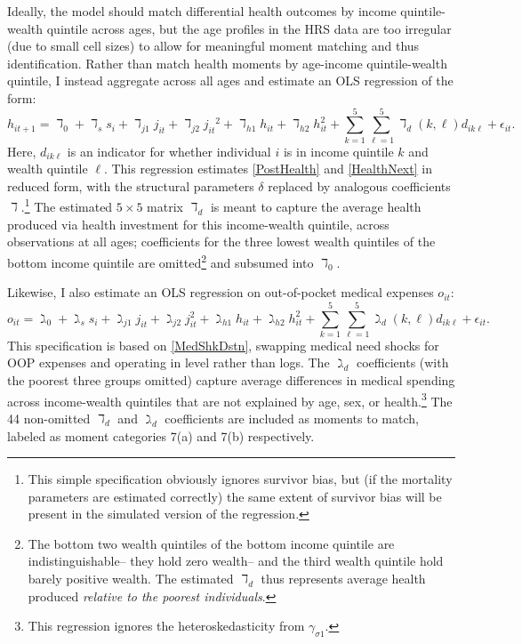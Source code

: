 \documentclass[12pt,pdftex,letterpaper]{article}
\newcommand{\Health}{h}
\newcommand{\MedShkParam}{\gamma}
\newcommand{\MedShkParamAlt}{\gimel}
\newcommand{\OOP}{o}
\newcommand{\HealthParam}{\delta}
\newcommand{\HealthParamAlt}{\daleth}
\newcommand{\Sex}{s}
\begin{document}
Ideally, the model should match differential health outcomes by income quintile-wealth quintile across ages, but the age profiles in the HRS data are too irregular (due to small cell sizes) to allow for meaningful moment matching and thus identification.  Rather than match health moments by age-income quintile-wealth quintile, I instead aggregate across all ages and estimate an OLS regression of the form:
\begin{equation}\label{HealthOLS}
\Health_{it+1} = \HealthParamAlt_0 + \HealthParamAlt_{\Sex} \Sex_i + \HealthParamAlt_{j1} j_{it} + \HealthParamAlt_{j2} {j_{it}}^2 + \HealthParamAlt_{\Health 1} \Health_{it} + \HealthParamAlt_{\Health 2} \Health_{it}^2 + \sum_{k=1}^{5} \sum_{\ell=1}^{5} \HealthParamAlt_{d}(k,\ell) d_{ik\ell} + \epsilon_{it}.
\end{equation}
Here, $d_{ik\ell}$ is an indicator for whether individual $i$ is in income quintile $k$ and wealth quintile $\ell$.  This regression estimates \eqref{PostHealth} and \eqref{HealthNext} in reduced form, with the structural parameters $\HealthParam$ replaced by analogous coefficients $\HealthParamAlt$.\footnote{This simple specification obviously ignores survivor bias, but (if the mortality parameters are estimated correctly) the same extent of survivor bias will be present in the simulated version of the regression.}  The estimated $5 \times 5$ matrix $\HealthParamAlt_d$ is meant to capture the average health produced via health investment for this income-wealth quintile, across observations at all ages; coefficients for the three lowest wealth quintiles of the bottom income quintile are omitted\footnote{The bottom two wealth quintiles of the bottom income quintile are indistinguishable-- they hold zero wealth-- and the third wealth quintile hold barely positive wealth.  The estimated $\HealthParamAlt_d$ thus represents average health produced \textit{relative to the poorest individuals}.} and subsumed into $\HealthParamAlt_0$.

Likewise, I also estimate an OLS regression on out-of-pocket medical expenses $\OOP_{it}$:
\begin{equation}\label{OOPOLS}
\OOP_{it} = \MedShkParamAlt_0 + \MedShkParamAlt_{\Sex} \Sex_i + \MedShkParamAlt_{j1} j_{it} + \MedShkParamAlt_{j2} j_{it}^2 + \MedShkParamAlt_{\Health 1} \Health_{it} + \MedShkParamAlt_{\Health 2} \Health_{it}^2 + \sum_{k=1}^{5} \sum_{\ell=1}^{5} \MedShkParamAlt_{d}(k,\ell) d_{ik\ell} + \epsilon_{it}.
\end{equation}
This specification is based on \eqref{MedShkDstn}, swapping medical need shocks for OOP expenses and operating in level rather than logs.  The $\MedShkParamAlt_d$ coefficients (with the poorest three groups omitted) capture average differences in medical spending across income-wealth quintiles that are not explained by age, sex, or health.\footnote{This regression ignores the heteroskedasticity from $\MedShkParam_{\sigma 1}$.}  The 44 non-omitted $\HealthParamAlt_d$ and $\MedShkParamAlt_d$ coefficients are included as moments to match, labeled as moment categories 7(a) and 7(b) respectively.
\end{document}
